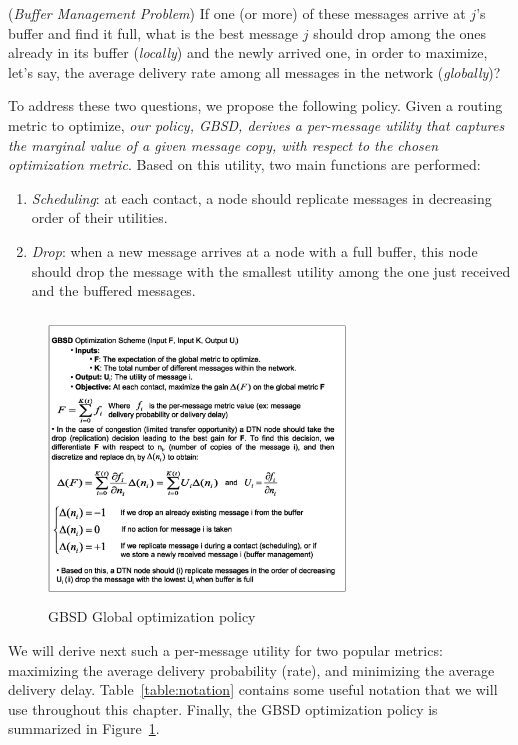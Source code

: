 (\emph{Buffer Management Problem}) If one (or more) of these messages arrive at $j$'s buffer and find it full, what is the best message $j$ should drop among the ones already in its buffer (\emph{locally}) and the newly arrived one, in order to maximize, let's say, the average delivery rate among all messages in the network (\emph{globally})?

To address these two questions, we propose the following policy. Given a routing metric to optimize, \emph{our policy, GBSD, derives a per-message utility that captures the \emph{marginal value} of a given message copy, with respect to the chosen optimization metric}. Based on this utility, two main functions are performed:

\begin{enumerate}
\item \emph{Scheduling}: at each contact, a node should replicate messages in decreasing order of their utilities.
\item \emph{Drop}: when a new message arrives at a node with a full buffer, this node should drop the message with the smallest utility among the one just received and the buffered messages.
\end{enumerate}

\begin{figure}[!h]
\centering
\includegraphics[width=3.1in,height=3in]{Chapitre3/GOS.eps}
\caption{GBSD Global optimization policy}
\label{GlobalOptimizationSchema}
\end{figure}

We will derive next such a per-message utility for two popular metrics: maximizing the average delivery probability (rate), and minimizing the average delivery delay. Table~\ref{table:notation} contains some useful notation that we will use throughout this chapter. Finally, the GBSD optimization policy is summarized in Figure~\ref{GlobalOptimizationSchema}.

